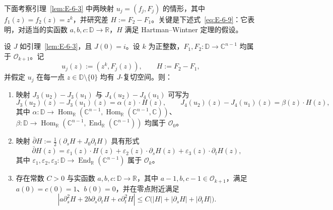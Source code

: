 下面考察引理~\ref{lem:E-6-3} 中两映射 $u_j=(f_j,F_j)$ 的情形，其中 $f_1(z)=f_2(z)=z^k$，并研究差 $H:=F_2-F_1$。关键是下述式~\eqref{eq:E-6-9}：它表明，对适当的实函数 $a,b,c:\mathbb D\to\mathbb R$，$H$ 满足 Hartman--Wintner 定理的假设。

\begin{lemma}\label{lem:E-6-4}
设 $J$ 如引理~\ref{lem:E-6-3}，且 $J(0)=i$。设 $k$ 为正整数，$F_1,F_2:\mathbb D\to\mathbb C^{n-1}$ 均属于 $\mathcal O_{k+1}$。记
\[
  u_j(z):=(z^k,F_j(z)),\qquad H:=F_2-F_1,
\]
并假定 $u_j$ 在每一点 $z\in\mathbb D\setminus\{0\}$ 均有 $J$-复切空间。则：
\begin{enumerate}
\item[(i)] 映射 $J_3(u_2)-J_3(u_1)$ 与 $J_4(u_2)-J_4(u_1)$ 可写为
\[
  J_3(u_2)(z)-J_3(u_1)(z)=\alpha(z)\cdot H(z),\qquad
  J_4(u_2)(z)-J_4(u_1)(z)=\beta(z)\cdot H(z),
\]
其中 $\alpha:\mathbb D\to\operatorname{Hom}_{\mathbb R}(\mathbb C^{n-1},
\operatorname{Hom}_{\mathbb R}(\mathbb C^{n-1},\mathbb C))$、
$\beta:\mathbb D\to\operatorname{Hom}_{\mathbb R}(\mathbb C^{n-1},
\operatorname{End}_{\mathbb R}(\mathbb C^{n-1}))$ 均属于 $\mathcal O_0$。
\item[(ii)] 映射 $\bar\partial H:=\tfrac12(\partial_sH+J_0\partial_tH)$ 具有形式
\begin{equation}\label{eq:E-6-8}
  \bar\partial H(z)=\varepsilon_1(z)\cdot H(z)
      +\varepsilon_2(z)\cdot\partial_sH(z)
      +\varepsilon_3(z)\cdot\partial_tH(z),
\end{equation}
其中 $\varepsilon_1,\varepsilon_2,\varepsilon_3:\mathbb D\to
\operatorname{End}_{\mathbb R}(\mathbb C^{n-1})$ 属于 $\mathcal O_k$。
\item[(iii)] 存在常数 $C>0$ 与实函数 $a,b,c:\mathbb D\to\mathbb R$，其中 $a-1,b,c-1\in\mathcal O_{k+1}$，满足 $a(0)=c(0)=1$、$b(0)=0$，并在零点附近满足
\begin{equation}\label{eq:E-6-9}
  |a\partial_s^2H+2b\partial_s\partial_tH+c\partial_t^2H|
  \le C\bigl(|H|+|\partial_sH|+|\partial_tH|\bigr).
\end{equation}
\end{enumerate}
\end{lemma}

